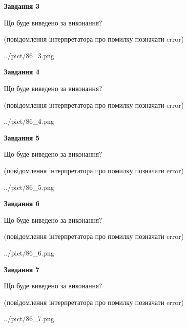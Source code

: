 \documentclass[12pt, ukrainian]{article}
\begin{document}
{\begin {large}
{\begin {center}\textbf{Завдання 3}\end {center}}\par
Що буде виведено за виконання?\par
 (повідомлення інтерпретатора про помилку позначати error)\par
\begin{center}
	{../pict/86_3.png}
\end{center}
\newpage

{\begin {center}\textbf{Завдання 4}\end {center}}\par
Що буде виведено за виконання?\par
 (повідомлення інтерпретатора про помилку позначати error)\par
\begin{center}
	{../pict/86_4.png}
\end{center}
\newpage

{\begin {center}\textbf{Завдання 5}\end {center}}\par
Що буде виведено за виконання?\par
 (повідомлення інтерпретатора про помилку позначати error)\par
\begin{center}
	{../pict/86_5.png}
\end{center}
\newpage

{\begin {center}\textbf{Завдання 6}\end {center}}\par
Що буде виведено за виконання?\par
 (повідомлення інтерпретатора про помилку позначати error)\par
\begin{center}
	{../pict/86_6.png}
\end{center}
\newpage

{\begin {center}\textbf{Завдання 7}\end {center}}\par
Що буде виведено за виконання?\par
 (повідомлення інтерпретатора про помилку позначати error)\par
\begin{center}
	{../pict/86_7.png}
\end{center}
\newpage


\end{large}}
\end{document}

